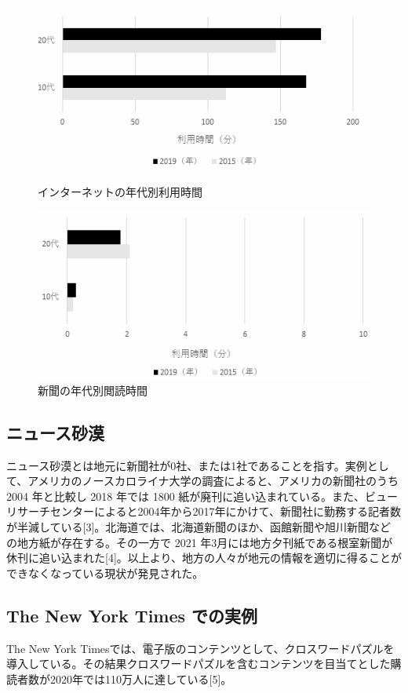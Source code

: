 \begin{figure}[htbp]
    \begin{minipage}[b]{0.45\linewidth}
        \centering
        \includegraphics[keepaspectratio, scale=0.35]{images/newspaper2.png}
        \caption{インターネットの年代別利用時間}
    \end{minipage}
    \begin{minipage}[b]{0.45\linewidth}
        \centering
        \includegraphics[keepaspectratio, scale=0.35]{images/newspaper3.png}
        \caption{新聞の年代別閲読時間 }
    \end{minipage}
\end{figure}

\subsection{ニュース砂漠}
ニュース砂漠とは地元に新聞社が0社、または1社であることを指す。実例として、アメリカのノースカロライナ大学の調査によると、アメリカの新聞社のうち 2004 年と比較し 2018 年では 1800 紙が廃刊に追い込まれている。また、ビューリサーチセンターによると2004年から2017年にかけて、新聞社に勤務する記者数が半減している[3]。北海道では、北海道新聞のほか、函館新聞や旭川新聞などの地方紙が存在する。その一方で 2021 年3月には地方夕刊紙である根室新聞が休刊に追い込まれた[4]。以上より、地方の人々が地元の情報を適切に得ることができなくなっている現状が発見された。

\subsection{The New York Times での実例}
The New York Timesでは、電子版のコンテンツとして、クロスワードパズルを導入している。その結果クロスワードパズルを含むコンテンツを目当てとした購読者数が2020年では110万人に達している[5]。
